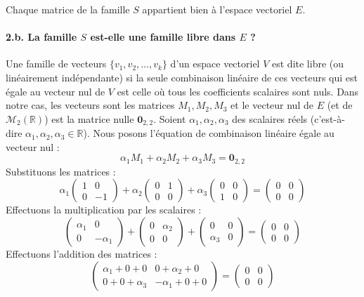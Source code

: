 \documentclass{report}
\begin{document}
Chaque matrice de la famille $S$ appartient bien à l'espace vectoriel $E$.

\paragraph*{2.b. La famille $S$ est-elle une famille libre dans $E$ ?}

Une famille de vecteurs $\{v_1, v_2, \dots, v_k\}$ d'un espace vectoriel $V$ est dite libre (ou linéairement indépendante) si la seule combinaison linéaire de ces vecteurs qui est égale au vecteur nul de $V$ est celle où tous les coefficients scalaires sont nuls.
Dans notre cas, les vecteurs sont les matrices $M_1, M_2, M_3$ et le vecteur nul de $E$ (et de $\mathcal{M}_2(\mathbb{R})$) est la matrice nulle $\mathbf{0}_{2,2}$.
Soient $\alpha_1, \alpha_2, \alpha_3$ des scalaires réels (c'est-à-dire $\alpha_1, \alpha_2, \alpha_3 \in \mathbb{R}$).
Nous posons l'équation de combinaison linéaire égale au vecteur nul :
$$ \alpha_1 M_1 + \alpha_2 M_2 + \alpha_3 M_3 = \mathbf{0}_{2,2} $$
Substituons les matrices :
$$ \alpha_1 \begin{pmatrix} 1 & 0 \\ 0 & -1 \end{pmatrix} + \alpha_2 \begin{pmatrix} 0 & 1 \\ 0 & 0 \end{pmatrix} + \alpha_3 \begin{pmatrix} 0 & 0 \\ 1 & 0 \end{pmatrix} = \begin{pmatrix} 0 & 0 \\ 0 & 0 \end{pmatrix} $$
Effectuons la multiplication par les scalaires :
$$ \begin{pmatrix} \alpha_1 & 0 \\ 0 & -\alpha_1 \end{pmatrix} + \begin{pmatrix} 0 & \alpha_2 \\ 0 & 0 \end{pmatrix} + \begin{pmatrix} 0 & 0 \\ \alpha_3 & 0 \end{pmatrix} = \begin{pmatrix} 0 & 0 \\ 0 & 0 \end{pmatrix} $$
Effectuons l'addition des matrices :
$$ \begin{pmatrix} \alpha_1 + 0 + 0 & 0 + \alpha_2 + 0 \\ 0 + 0 + \alpha_3 & -\alpha_1 + 0 + 0 \end{pmatrix} = \begin{pmatrix} 0 & 0 \\ 0 & 0 \end{pmatrix} $$
\end{document}
